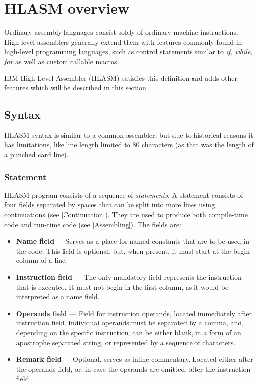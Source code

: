 \chapter{HLASM overview}

Ordinary assembly languages consist solely of ordinary machine instructions. High-level assemblers generally extend them with features commonly found in high-level programming languages, such as control statements similar to \emph{if, while, for} as well as custom callable macros.

IBM High Level Assembler (HLASM) satisfies this definition and adds other features which will be described in this section.

\section{Syntax}

HLASM syntax is similar to a common assembler, but due to historical reasons it has limitations, like line length limited to 80 characters (as that was the length of a punched card line).

\subsection{Statement}

HLASM program consists of a sequence of \emph{statements}. A statement consists of four fields separated by spaces that can be split into more lines using continuations (see \cref{Continuation}). They are used to produce both compile-time code and run-time code (see \cref{Assembling}). The fields are:
\begin{itemize}
	\item \textbf{Name field} --- Serves as a place for named constants that are to be used in the code. This field is optional, but, when present, it must start at the begin column of a line.
	
	\item \textbf{Instruction field} --- The only mandatory field represents the instruction that is executed. It must not begin in the first column, as it would be interpreted as a name field.
	
	\item \textbf{Operands field} --- Field for instruction operands, located immediately after instruction field. Individual operands must be separated by a comma, and, depending on the specific instruction, can be either blank, in a form of an apostrophe separated string, or represented by a sequence of characters.
	
	\item \textbf{Remark field} --- Optional, serves as inline commentary. Located either after the operands field, or, in case the operands are omitted, after the instruction field. 
\end{itemize}

